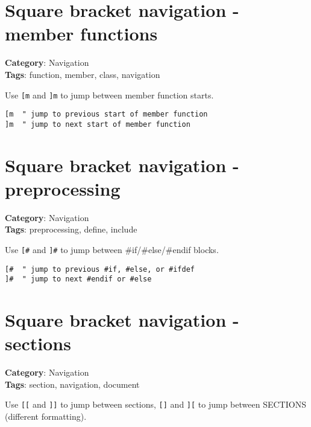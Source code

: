 {{{{{{{{{{\section{Square bracket navigation - member functions}

\textbf{Category}: Navigation\\ \textbf{Tags}: function, member, class, navigation
\vspace{0.5cm}

Use {\footnotesize \Verb§[m§} and {\footnotesize \Verb§]m§} to jump between member function starts.

\begin{Exa*}{}
\begin{Verbatim}[fontsize=\footnotesize, breaklines, breakanywhere]
[m  " jump to previous start of member function
]m  " jump to next start of member function
\end{Verbatim}
\end{Exa*}

\section{Square bracket navigation - preprocessing}

\textbf{Category}: Navigation\\ \textbf{Tags}: preprocessing, define, include
\vspace{0.5cm}

Use {\footnotesize \Verb§[#§} and {\footnotesize \Verb§]#§} to jump between \#if/\#else/\#endif blocks.

\begin{Exa*}{}
\begin{Verbatim}[fontsize=\footnotesize, breaklines, breakanywhere]
[#  " jump to previous #if, #else, or #ifdef
]#  " jump to next #endif or #else
\end{Verbatim}
\end{Exa*}

\section{Square bracket navigation - sections}

\textbf{Category}: Navigation\\ \textbf{Tags}: section, navigation, document
\vspace{0.5cm}

Use {\footnotesize \Verb§[[§} and {\footnotesize \Verb§]]§} to jump between sections, {\footnotesize \Verb§[]§} and {\footnotesize \Verb§][§} to jump between SECTIONS (different formatting).

}}}}}}}}}}
